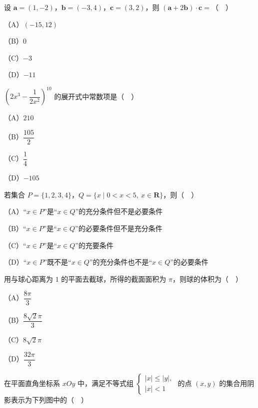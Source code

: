


\begin{question}
设 $\boldsymbol a=(1,-2)$，$\boldsymbol b=(-3,4)$，$\boldsymbol c=(3,2)$，则 $(\boldsymbol a+2\boldsymbol b)\cdot\boldsymbol c=$（　）

（A）$(-15,12)$

（B）$0$

（C）$-3$

（D）$-11$

\end{question}
\begin{question}
$\left(2x^3-\dfrac1{2x^2}\right)^{10}$ 的展开式中常数项是（　）

（A）$210$

（B）$\dfrac{105}2$

（C）$\dfrac14$

（D）$-105$

\end{question}
\begin{question}
若集合 $P=\{1,2,3,4\}$，$Q=\{x\mid 0<x<5,\ x\in\mathbf R\}$，则（　）

（A）“$x\in P$”是“$x\in Q$”的充分条件但不是必要条件

（B）“$x\in P$”是“$x\in Q$”的必要条件但不是充分条件

（C）“$x\in P$”是“$x\in Q$”的充要条件

（D）“$x\in P$”既不是“$x\in Q$”的充分条件也不是“$x\in Q$”的必要条件

\end{question}
\begin{question}
用与球心距离为 $1$ 的平面去截球，所得的截面面积为 $\pi$，则球的体积为（　）

（A）$\dfrac{8\pi}3$

（B）$\dfrac{8\sqrt2\pi}3$

（C）$8\sqrt2\pi$

（D）$\dfrac{32\pi}3$

\Needspace{0.4\textheight}
\end{question}
\begin{question}
在平面直角坐标系 $xOy$ 中，满足不等式组 $\begin{cases}|x|\leqslant|y|,\\ |x|<1\end{cases}$ 的点 $(x,y)$ 的集合用阴影表示为下列图中的（　）
\nopagebreak[4]
\begin{center}\end{center}
\nopagebreak[4]
\end{question}
